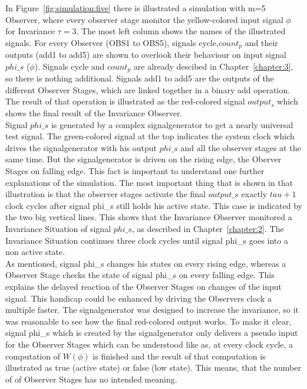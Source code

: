 In Figure~\ref{fig:simulation:five} there is illustrated a simulation with m=5 Observer, where every observer stage monitor the yellow-colored input signal $\phi$ for Invariance $\tau=3$.
The most left column shows the names of the illustrated signals. For every Observer (OBS1 to OBS5), signals cycle,$count_p$ and their outputs (add1 to add5) are shown to overlook their
behaviour on input signal $phi\_s$ ($\phi$). Signals cycle and $count_p$ are already descibed in Chapter~\ref{chapter:3}, so there is nothing additional.
Signals add1 to add5 are the outputs of the different Observer Stages, which are linked together in a binary add operation.
The result of that operation is illustrated as the red-colored signal $output_s$ which shows the final result of the Invariance Observer.\\
Signal $phi\_s$ is generated by a complex signalgenerator to get a nearly universal test signal. The green-colored signal at the top indicates the system clock which drives the signalgenerator
with his output $phi\_s$ and all the observer stages at the same time. But the signalgenerator is driven on the rising edge, the Oberver Stages on falling edge.
This fact is important to understand one further explanations of the simulation. 
The most important thing that is shown in that illustration is that the observer stages activate the final $output\_s$ exactly $tau + 1$  clock cycles after signal phi\_s still holds his active state.
This case is  indicated by the two big vertical lines. This shows that the Invariance Observer monitored a Invariance Situation of signal $phi\_s$, as described in Chapter~\ref{chapter:2}. 
The Invariance Situation continues three clock cycles until signal phi\_s goes into a non active state. \\
As mentioned, signal phi\_s changes his states on every rising edge, whereas a Observer Stage checks the state of signal phi\_s on every falling edge. 
This explains the delayed reaction of the Observer Stages on changes of the input signal. This handicap could be enhanced by driving the Observers clock a multiple faster.
The signalgenerator was designed to increase the invariance, so it was reasonable to see how the final red-colored output works. 
To make it clear, signal phi\_s which is created by the signalgenerator only delivers a pseudo input for the Observer Stages which can be understood like as, at every clock cycle, a computation of
$W(\phi)$ is finished and the result of that computation is illustrated as true (active state) or false (low state). This means, that the number of of Observer Stages has no intended meaning.
